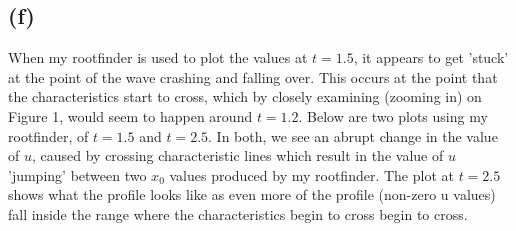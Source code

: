 \documentclass{article}
\begin{document}
\subsection*{(f)}
When my rootfinder is used to plot the values at $t=1.5$, it appears to get 'stuck' at the point of the wave crashing and falling over. This occurs at the point that the characteristics start to cross, which by closely examining (zooming in) on Figure 1, would seem to happen around $t = 1.2$. Below are two plots using my rootfinder, of $t = 1.5$ and $t = 2.5$. In both, we see an abrupt change in the value of $u$, caused by crossing characteristic lines which result in the value of $u$ 'jumping' between two $x_0$ values produced by my rootfinder. The plot at $t=2.5$ shows what the profile looks like as even more of the profile (non-zero u values) fall inside the range where the characteristics begin to cross begin to cross.
\end{document}
